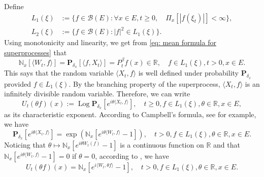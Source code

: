 \documentclass[UTF8]{pkuthss}
\theoremstyle{plain}
\theoremstyle{definition}
\numberwithin{equation}{section}
\begin{document}
    Define
\begin{align}
    L_1(\xi)
    &:= \{f\in \mathcal B(E): \forall x\in E, t\geq 0, \quad \Pi_x[|f(\xi_t)|]< \infty\},
    \\L_2(\xi)
    &:= \{f \in \mathcal B(E): |f|^2 \in L_1(\xi)\}.
\end{align}
    Using monotonicity and linearity, we get from \eqref{eq: mean formula for superprocesses}  that
\begin{equation}
   \mathbb N_x[\langle W_t, f\rangle]   
    =\mathbf P_{\delta_x}[\langle f, X_t\rangle]
    =P^{\beta}_t f(x) \in \mathbb R,
    \quad f\in L_1(\xi), t > 0,x\in E.
\end{equation}
    This says that the random variable $\langle X_t, f\rangle$ is well defined under probability $\mathbf P_{\delta_x}$ provided $f\in L_1(\xi)$.
    By the branching property of the superprocess, $\langle X_t, f\rangle$ is an infinitely divisible random variable.
    Therefore, we can write
\[
    U_t(\theta f)(x) := \operatorname{Log} \mathbf P_{\delta_x}[e^{i \theta \langle X_t, f\rangle}],
    \quad t\geq 0, f\in L_1(\xi), \theta \in \mathbb R, x\in E,
\]
    as its characteristic exponent.
    According to Campbell's formula, see \cite[Theorem 2.7]{Kyprianou2014Fluctuations} for example, we have
\[
    \mathbf P_{\delta_x} [e^{i\theta \langle X_t, f\rangle}]
    = \exp(\mathbb N_x[ e^{i\theta \langle W_t, f\rangle} - 1]),
    \quad t>0, f\in L_1(\xi), \theta \in \mathbb R, x\in E.
\]
    Noticing that $\theta \mapsto \mathbb N_x[e^{i\theta W_t(f)} - 1]$ is a continuous function on $\mathbb R$ and that $\mathbb N_x[e^{i\theta \langle W_t, f\rangle} - 1] = 0$ if $\theta = 0$, according to \cite[Lemma 7.6]{Sato2013Levy}, we have
\begin{equation}
\label{eq: N and characteristic exponent}
    U_t(\theta f)(x) = \mathbb N_x[e^{i \langle W_t, \theta f\rangle} - 1],
    \quad t>0, f\in L_1(\xi), \theta \in \mathbb R, x\in E.
\end{equation}
\end{document}
